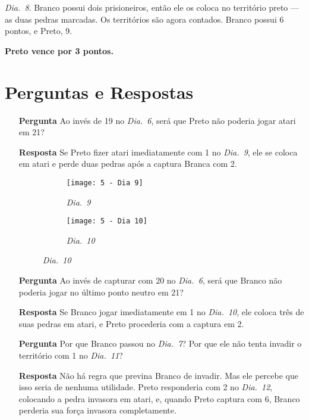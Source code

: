 \emph{Dia.\@~8}. Branco possui dois prisioneiros, então ele os coloca no território preto --- as duas pedras marcadas. Os territórios são agora contados. Branco possui 6 pontos, e Preto, 9.

\textbf{Preto vence por 3 pontos.}

\pagebreak

\section{Perguntas e Respostas}

\begin{itemize}
  \item[\textbf{Pergunta}]
    Ao invés de 19 no \emph{Dia.\@~6}, será que Preto não poderia jogar atari em 21?
  \item[\textbf{Resposta}]
    Se Preto fizer atari imediatamente com 1 no \emph{Dia.\@~9}, ele se coloca em atari e perde duas pedras após a captura Branca com 2.

    \begin{figure}[h!]
      \centering
      \begin{subfigure}[t]{.3\textwidth}
        \centering
        \texttt{[image: 5 - Dia 9]}
        \captionsetup{justification=centering}
        \caption*{\emph{Dia.\@~9}}
      \end{subfigure}
      \hspace{1cm}
      \begin{subfigure}[t]{.3\textwidth}
        \centering
        \texttt{[image: 5 - Dia 10]}
        \captionsetup{justification=centering}
        \caption*{\emph{Dia.\@~10}}
      \end{subfigure}
    \end{figure}

  \item[\textbf{Pergunta}]
    Ao invés de capturar com 20 no \emph{Dia.\@~6}, será que Branco não poderia jogar no último ponto neutro em 21?
  \item[\textbf{Resposta}]
    Se Branco jogar imediatamente em 1 no \emph{Dia.\@~10}, ele coloca três de suas pedras em atari, e Preto procederia com a captura em 2.
  \item[\textbf{Pergunta}]
    Por que Branco passou no \emph{Dia.\@~7}? Por que ele não tenta invadir o território com 1 no \emph{Dia.\@~11}?

  \item[\textbf{Resposta}]
    Não há regra que previna Branco de invadir. Mas ele percebe que isso seria de nenhuma utilidade. Preto responderia com 2 no \emph{Dia.\@~12}, colocando a pedra invasora em atari, e, quando Preto captura com 6, Branco perderia sua força invasora completamente.


\end{itemize}
